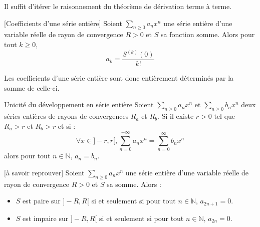 \documentclass[french,11pt,twoside]{VcCours}
\begin{document}
\begin{Demonstration}{} Il suffit d'itérer le raisonnement du théorème de dérivation terme à terme.
\end{Demonstration}

\begin{Corollaire}{}[Coefficients d'une série entière] Soient $\sum_{n \geq 0} a_n x^n$ une série entière d'une variable réelle de rayon de convergence $R>0$ et $S$ sa fonction somme. Alors pour tout $k \geq 0$,
$$ a_k = \frac{S^{(k)}(0)}{k!}$$
\end{Corollaire}

\begin{Demonstration}{}

\vspace{4cm}
\end{Demonstration}

\begin{Remarque}{} Les coefficients d'une série entière sont donc entièrement déterminés par la somme de celle-ci.
\end{Remarque}

\begin{Theoreme}{Unicité du développement en série entière}
Soient $\sum_{n \geq 0} a_n x^n$ et $\sum_{n \geq 0} b_n x^n$ deux séries entières de rayons de convergences $R_a$ et $R_b$. Si il existe $r>0$ tel que $R_a>r$ et $R_b >r$ et si :
$$ \forall x \in ]-r,r[, \sum_{n=0}^{+ \infty} a_n x^n = \sum_{n=0}^{\infty} b_n x^n$$
alors pour tout $n \in \mathbb{N}$, $a_n=b_n$.
\end{Theoreme}

\begin{Demonstration}{}
\vspace{4cm}
\end{Demonstration}

\begin{Corollaire}{}[à savoir reprouver] Soient $\sum_{n \geq 0} a_n x^n$ une série entière d'une variable réelle de rayon de convergence $R>0$ et $S$ sa somme. Alors :
\begin{itemize}
\item $S$ est paire sur $]-R,R[$ si et seulement si pour tout $n \in \mathbb{N}$, $a_{2n+1}=0$.
\item $S$ est impaire sur $]-R,R[$ si et seulement si pour tout $n \in \mathbb{N}$, $a_{2n}=0$.
\end{itemize}
\end{Corollaire}

\begin{Demonstration}{}

\vspace{3cm}
\end{Demonstration}
\end{document}
